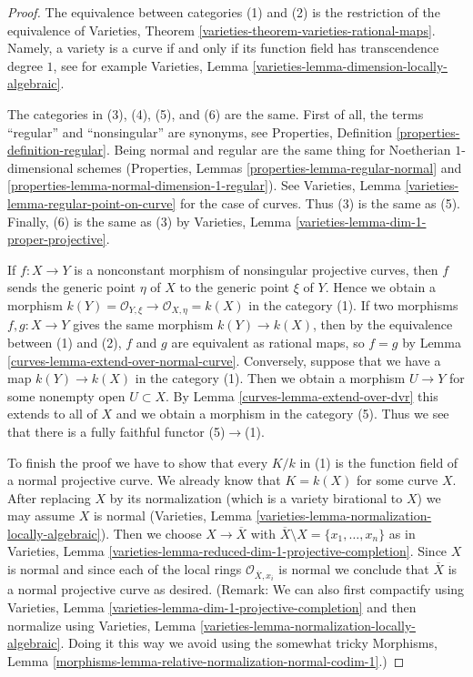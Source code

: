 \begin{proof}

The equivalence between categories (1) and (2) is the restriction of the
equivalence of
Varieties, Theorem \ref{varieties-theorem-varieties-rational-maps}.
Namely, a variety is a curve if and only if its function field has
transcendence degree $1$, see for example
Varieties, Lemma \ref{varieties-lemma-dimension-locally-algebraic}.

\medskip\noindent
The categories in (3), (4), (5), and (6) are the same. First of all, the
terms ``regular'' and ``nonsingular'' are synonyms, see
Properties, Definition \ref{properties-definition-regular}.
Being normal and regular are the same thing for Noetherian
$1$-dimensional schemes
(Properties, Lemmas \ref{properties-lemma-regular-normal} and
\ref{properties-lemma-normal-dimension-1-regular}). See
Varieties, Lemma \ref{varieties-lemma-regular-point-on-curve}
for the case of curves. Thus (3) is the same as (5). Finally, (6)
is the same as (3) by
Varieties, Lemma \ref{varieties-lemma-dim-1-proper-projective}.

\medskip\noindent
If $f : X \to Y$ is a nonconstant morphism of nonsingular projective curves,
then $f$ sends the generic point $\eta$ of $X$ to the generic point $\xi$ of
$Y$. Hence we obtain a morphism
$k(Y) = \mathcal{O}_{Y, \xi} \to \mathcal{O}_{X, \eta} = k(X)$
in the category (1). If two morphisms $f,g: X \to Y$ gives the same morphism
$k(Y) \to k(X)$, then by the equivalence between (1) and (2),
$f$ and $g$ are equivalent as rational maps, so $f=g$ by
Lemma \ref{curves-lemma-extend-over-normal-curve}.
Conversely, suppose that we have a map
$k(Y) \to k(X)$ in the category (1). Then we obtain a morphism $U \to Y$
for some nonempty open $U \subset X$. By Lemma \ref{curves-lemma-extend-over-dvr}
this extends to all of $X$ and we obtain a morphism in the category (5).
Thus we see that there is a fully faithful functor (5)$\to$(1).

\medskip\noindent
To finish the proof we have to show that every $K/k$ in (1)
is the function field of a normal projective curve.
We already know that $K = k(X)$ for some curve $X$.
After replacing $X$ by its normalization
(which is a variety birational to $X$)
we may assume $X$ is normal
(Varieties, Lemma \ref{varieties-lemma-normalization-locally-algebraic}).
Then we choose $X \to \overline{X}$ with
$\overline{X} \setminus X = \{x_1, \ldots, x_n\}$ as in
Varieties, Lemma \ref{varieties-lemma-reduced-dim-1-projective-completion}.
Since $X$ is normal and since each
of the local rings $\mathcal{O}_{\overline{X}, x_i}$ is normal
we conclude that $\overline{X}$ is a normal projective curve as desired.
(Remark: We can also first compactify using
Varieties, Lemma \ref{varieties-lemma-dim-1-projective-completion}
and then normalize using
Varieties, Lemma \ref{varieties-lemma-normalization-locally-algebraic}.
Doing it this way we avoid using the somewhat tricky
Morphisms, Lemma \ref{morphisms-lemma-relative-normalization-normal-codim-1}.)
\end{proof}

